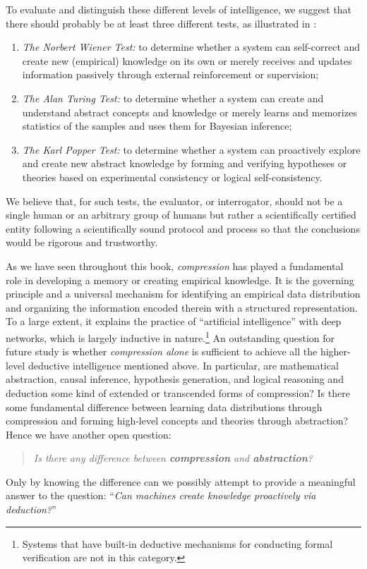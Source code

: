 \documentclass[../../book-main.tex]{subfiles}
\begin{document}
To evaluate and distinguish these different levels of intelligence,
we suggest that there should probably be at least three different
tests, as illustrated in :
\begin{enumerate}
    \item \textit{The Norbert Wiener Test:} to determine whether a
        system can self-correct and create new (empirical) knowledge
        on its own or merely receives and updates information
        passively through external reinforcement or supervision;
    \item \textit{The Alan Turing Test:} to determine whether a
        system can create and understand abstract concepts and
        knowledge or merely learns and memorizes statistics of the
        samples and uses them for Bayesian inference;
    \item \textit{The Karl Popper Test:} to determine whether a
        system can proactively explore and create new abstract
        knowledge by forming and verifying hypotheses or theories
        based on experimental consistency or logical self-consistency.
\end{enumerate}
We believe that, for such tests, the evaluator, or interrogator,
should not be a single human or an arbitrary group of humans but rather a
scientifically certified entity following a scientifically sound
protocol and process so that the conclusions would be rigorous and trustworthy.

As we have seen throughout this book, \textit{compression} has played
a fundamental role in developing a memory or creating empirical knowledge. It is the governing principle and a universal mechanism for identifying an
empirical data distribution and organizing the information encoded therein with a structured representation. To a large extent, it explains the practice of ``artificial intelligence'' with deep networks, which is largely inductive in nature.\footnote{Systems that have built-in deductive mechanisms for conducting formal verification are not in this category.} An outstanding question for future
study is whether \textit{compression alone} is sufficient to achieve
all the higher-level deductive intelligence mentioned above.
In particular, are mathematical abstraction, causal inference, hypothesis
generation, and logical reasoning and deduction some kind of extended or
transcended forms of compression? Is there some fundamental difference between learning data distributions through compression and forming high-level concepts and theories through abstraction? Hence we have another open question:
\begin{quote}
    \centering
    \textit{Is there any difference between \textbf{compression} and
    \textbf{abstraction}?}
\end{quote}
Only by knowing the difference can we possibly attempt to provide a meaningful answer to the question: ``\textit{Can machines create knowledge proactively via deduction?}''
\end{document}
